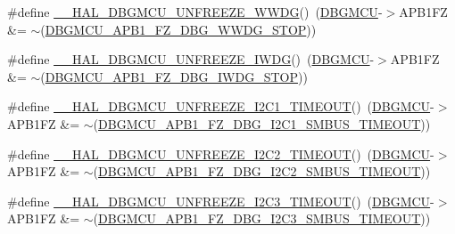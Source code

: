 \begin{DoxyCompactItemize}
\item 
\#define \hyperlink{group___h_a_l___exported___macros_gaa14c8a2e8911976b8c8ce6ca278372a2}{\+\_\+\+\_\+\+H\+A\+L\+\_\+\+D\+B\+G\+M\+C\+U\+\_\+\+U\+N\+F\+R\+E\+E\+Z\+E\+\_\+\+W\+W\+DG}()~(\hyperlink{group___peripheral__declaration_ga92ec6d9ec2251fda7d4ce09748cd74b4}{D\+B\+G\+M\+CU}-\/$>$A\+P\+B1\+FZ \&= $\sim$(\hyperlink{group___peripheral___registers___bits___definition_ga8a49d5e849185d09ee6c7594512ffe88}{D\+B\+G\+M\+C\+U\+\_\+\+A\+P\+B1\+\_\+\+F\+Z\+\_\+\+D\+B\+G\+\_\+\+W\+W\+D\+G\+\_\+\+S\+T\+OP}))
\item 
\#define \hyperlink{group___h_a_l___exported___macros_gab29a88ef9c31cbe107c58b9ecc3bdf79}{\+\_\+\+\_\+\+H\+A\+L\+\_\+\+D\+B\+G\+M\+C\+U\+\_\+\+U\+N\+F\+R\+E\+E\+Z\+E\+\_\+\+I\+W\+DG}()~(\hyperlink{group___peripheral__declaration_ga92ec6d9ec2251fda7d4ce09748cd74b4}{D\+B\+G\+M\+CU}-\/$>$A\+P\+B1\+FZ \&= $\sim$(\hyperlink{group___peripheral___registers___bits___definition_gada8989cb96dd5d6dbdaaf16e1f127c6a}{D\+B\+G\+M\+C\+U\+\_\+\+A\+P\+B1\+\_\+\+F\+Z\+\_\+\+D\+B\+G\+\_\+\+I\+W\+D\+G\+\_\+\+S\+T\+OP}))
\item 
\#define \hyperlink{group___h_a_l___exported___macros_ga636083d6b6931b1cf35e7c39aebf0723}{\+\_\+\+\_\+\+H\+A\+L\+\_\+\+D\+B\+G\+M\+C\+U\+\_\+\+U\+N\+F\+R\+E\+E\+Z\+E\+\_\+\+I2\+C1\+\_\+\+T\+I\+M\+E\+O\+UT}()~(\hyperlink{group___peripheral__declaration_ga92ec6d9ec2251fda7d4ce09748cd74b4}{D\+B\+G\+M\+CU}-\/$>$A\+P\+B1\+FZ \&= $\sim$(\hyperlink{group___peripheral___registers___bits___definition_gae83fb5d62c6e6fa1c2fd06084528404e}{D\+B\+G\+M\+C\+U\+\_\+\+A\+P\+B1\+\_\+\+F\+Z\+\_\+\+D\+B\+G\+\_\+\+I2\+C1\+\_\+\+S\+M\+B\+U\+S\+\_\+\+T\+I\+M\+E\+O\+UT}))
\item 
\#define \hyperlink{group___h_a_l___exported___macros_ga0308bdec86c19b7bbe236c4724d7d536}{\+\_\+\+\_\+\+H\+A\+L\+\_\+\+D\+B\+G\+M\+C\+U\+\_\+\+U\+N\+F\+R\+E\+E\+Z\+E\+\_\+\+I2\+C2\+\_\+\+T\+I\+M\+E\+O\+UT}()~(\hyperlink{group___peripheral__declaration_ga92ec6d9ec2251fda7d4ce09748cd74b4}{D\+B\+G\+M\+CU}-\/$>$A\+P\+B1\+FZ \&= $\sim$(\hyperlink{group___peripheral___registers___bits___definition_ga8f6320aba695f6c3f97608e478533e96}{D\+B\+G\+M\+C\+U\+\_\+\+A\+P\+B1\+\_\+\+F\+Z\+\_\+\+D\+B\+G\+\_\+\+I2\+C2\+\_\+\+S\+M\+B\+U\+S\+\_\+\+T\+I\+M\+E\+O\+UT}))
\item 
\#define \hyperlink{group___h_a_l___exported___macros_ga8beda05b7dc4962557f98a06e29326a4}{\+\_\+\+\_\+\+H\+A\+L\+\_\+\+D\+B\+G\+M\+C\+U\+\_\+\+U\+N\+F\+R\+E\+E\+Z\+E\+\_\+\+I2\+C3\+\_\+\+T\+I\+M\+E\+O\+UT}()~(\hyperlink{group___peripheral__declaration_ga92ec6d9ec2251fda7d4ce09748cd74b4}{D\+B\+G\+M\+CU}-\/$>$A\+P\+B1\+FZ \&= $\sim$(\hyperlink{group___peripheral___registers___bits___definition_ga7f7e5c708387aa1ddae35b892811b4e9}{D\+B\+G\+M\+C\+U\+\_\+\+A\+P\+B1\+\_\+\+F\+Z\+\_\+\+D\+B\+G\+\_\+\+I2\+C3\+\_\+\+S\+M\+B\+U\+S\+\_\+\+T\+I\+M\+E\+O\+UT}))

\end{DoxyCompactItemize}
